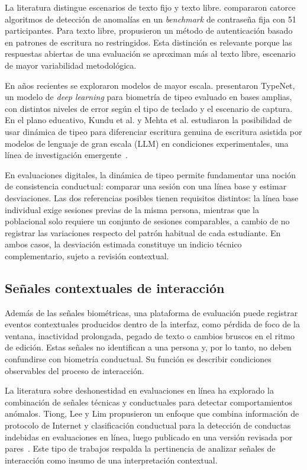 La literatura distingue escenarios de texto fijo y texto libre. \textcite{Killourhy2009} compararon catorce algoritmos de detección de anomalías en un \textit{benchmark} de contraseña fija con 51 participantes. Para texto libre, \textcite{Bergadano2002} propusieron un método de autenticación basado en patrones de escritura no restringidos. Esta distinción es relevante porque las respuestas abiertas de una evaluación se aproximan más al texto libre, escenario de mayor variabilidad metodológica.

En años recientes se exploraron modelos de mayor escala. \textcite{Acien2022} presentaron TypeNet, un modelo de \textit{deep learning} para biometría de tipeo evaluado en bases amplias, con distintos niveles de error según el tipo de teclado y el escenario de captura. En el plano educativo, Kundu et al. y Mehta et al. estudiaron la posibilidad de usar dinámica de tipeo para diferenciar escritura genuina de escritura asistida por modelos de lenguaje de gran escala (LLM) en condiciones experimentales, una línea de investigación emergente~\parencite{Kundu2024, Mehta2025}.

En evaluaciones digitales, la dinámica de tipeo permite fundamentar una noción de consistencia conductual: comparar una sesión con una línea base y estimar desviaciones. Las dos referencias posibles tienen requisitos distintos: la línea base individual exige sesiones previas de la misma persona, mientras que la poblacional solo requiere un conjunto de sesiones comparables, a cambio de no registrar las variaciones respecto del patrón habitual de cada estudiante. En ambos casos, la desviación estimada constituye un indicio técnico complementario, sujeto a revisión contextual.

\subsection{Señales contextuales de interacción}
\label{sec:senales_contextuales}

Además de las señales biométricas, una plataforma de evaluación puede registrar eventos contextuales producidos dentro de la interfaz, como pérdida de foco de la ventana, inactividad prolongada, pegado de texto o cambios bruscos en el ritmo de edición. Estas señales no identifican a una persona y, por lo tanto, no deben confundirse con biometría conductual. Su función es describir condiciones observables del proceso de interacción.

La literatura sobre deshonestidad en evaluaciones en línea ha explorado la combinación de señales técnicas y conductuales para detectar comportamientos anómalos. Tiong, Lee y Lim propusieron un enfoque que combina información de protocolo de Internet y clasificación conductual para la detección de conductas indebidas en evaluaciones en línea, luego publicado en una versión revisada por pares~\parencite{Tiong2022, Tiong2024}. Este tipo de trabajos respalda la pertinencia de analizar señales de interacción como insumo de una interpretación contextual.

